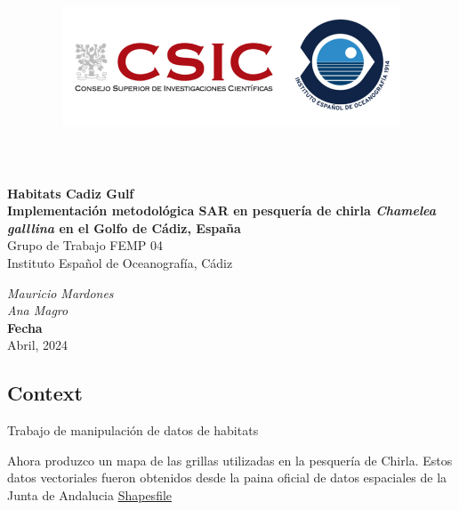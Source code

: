 \documentclass[
]{article}
\title{\includegraphics[width=10cm,height=\textheight]{IEO-logo2.png}}
\author{}
\date{\vspace{-2.5em}}
\begin{document}
\maketitle



\begin{flushleft}
\Large{\textbf{Habitats Cadiz Gulf}}\\
\vspace*{2\baselineskip}
\LARGE{\textbf{Implementación metodológica SAR en pesquería de chirla \textit{Chamelea galllina} en el Golfo de Cádiz, España}}\\
\vspace*{5\baselineskip}
\Large{Grupo de Trabajo FEMP 04}\\
\vspace*{1\baselineskip}
\Large{Instituto Español de Oceanografía, Cádiz }\\
\vspace*{4\baselineskip}
\end{flushleft}
\begin{flushright}
\large{\textit{Mauricio Mardones}}\\
\large{\textit{Ana Magro}}\\
\vspace*{1\baselineskip}
\normalsize{\textbf{Fecha}}\\
Abril, 2024
\end{flushright}



\hypersetup{linkcolor = black}
\newpage
{}

\newpage



\hypersetup{linkcolor = blue}

{
\hypersetup{linkcolor=}
\setcounter{tocdepth}{3}
\tableofcontents
}
\newpage

\hypertarget{context}{%
\subsection{Context}\label{context}}

Trabajo de manipulación de datos de habitats

Ahora produzco un mapa de las grillas utilizadas en la pesquería de Chirla. Estos datos vectoriales fueron obtenidos desde la paina oficial de datos espaciales de la Junta de Andalucia \href{https://portalrediam.cica.es/descargas?path=\%2F08_AMBITOS_INTERES_AMBIENTAL\%2F02_LITORAL_MARINO\%2F04_SOCIOECONOMIA\%2FZonasProduccionMoluscos}{Shapesfile}
\end{document}
